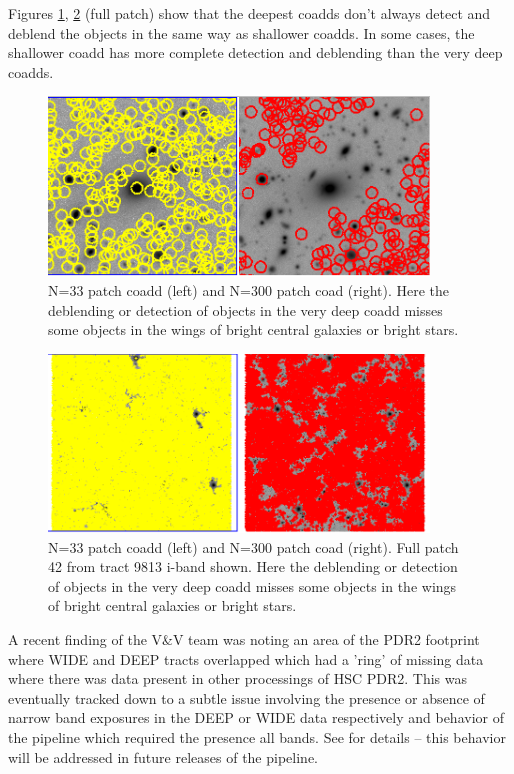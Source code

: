 Figures \ref{fig:deblend1}, \ref{fig:deblend2} (full patch) show that the deepest coadds
don't always detect and deblend the objects in the same way as shallower coadds.  In some cases, the
shallower coadd has more complete detection and deblending than the very deep coadds.  

 \begin{figure}[hbt!]
 \includegraphics[width=0.9\textwidth]{wobjects.png}
	 \caption{N=33 patch coadd (left) and N=300 patch coad (right).  Here the deblending or detection of objects in the very deep coadd misses some objects in the wings of bright central galaxies or bright stars.  \label{fig:deblend1}}
 \end{figure}

 \begin{figure}[hbt!]
 \includegraphics[width=0.9\textwidth]{full.png}
	 \caption{N=33 patch coadd (left) and N=300 patch coad (right).  Full patch 42 from tract 9813 i-band shown. Here the deblending or detection of objects in the very deep coadd misses some objects in the wings of bright central galaxies or bright stars.  \label{fig:deblend2}}
 \end{figure}


A recent finding of the V\&V team was noting an area of the PDR2 footprint where WIDE and DEEP tracts 
overlapped which had a 'ring' of missing data where there was data present in other processings of HSC PDR2.
This was eventually tracked down to a subtle issue involving the presence or absence of narrow band
exposures in the DEEP or WIDE data respectively and behavior of the pipeline which required the
presence all bands.  See  for details -- this behavior will be addressed in future releases
of the pipeline.
